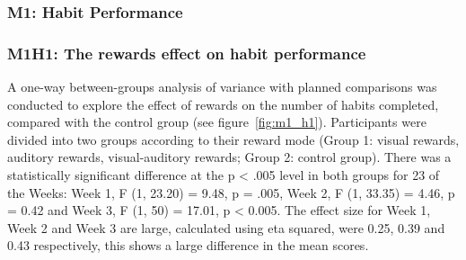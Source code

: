\subsubsection{M1: Habit Performance}
\subsubsection*{M1H1: The rewards effect on habit performance}

A one-way between-groups analysis of variance with planned comparisons was conducted to explore the effect of rewards on the number of habits completed, compared with the control group (see figure~\ref{fig:m1_h1}). Participants were divided into two groups according to their reward mode (Group 1: visual rewards, auditory rewards, visual-auditory rewards; Group 2: control group). There was a statistically significant difference at the p < .005 level in both groups for 2\/3 of the Weeks: Week 1, F (1, 23.20) = 9.48, p = .005, Week 2, F (1, 33.35) = 4.46, p = 0.42 and Week 3, F (1, 50) = 17.01, p < 0.005. The effect size for Week 1, Week 2 and Week 3 are large, calculated using eta squared, were 0.25, 0.39 and 0.43 respectively, this shows a large difference in the mean scores.


